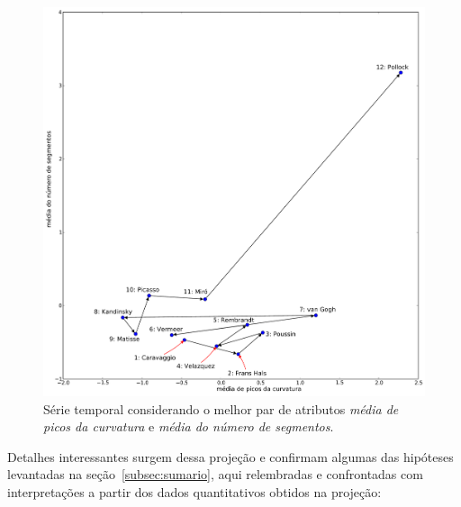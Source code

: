 \begin{figure}[h!]
\begin{center}
         \caption{Série temporal considerando o melhor par de atributos
        \emph{média de picos da curvatura} e \emph{média do número de
          segmentos}.}
        \label{fig:caso1_g2}
        \includegraphics[scale=.5]{figs/caso1_g2}
        \fonteminha
\end{center}
\end{figure}

Detalhes interessantes surgem dessa projeção e confirmam
algumas das hipóteses levantadas na seção~\ref{subsec:sumario}, aqui
relembradas e confrontadas com interpretações a partir dos dados
quantitativos obtidos na projeção:

